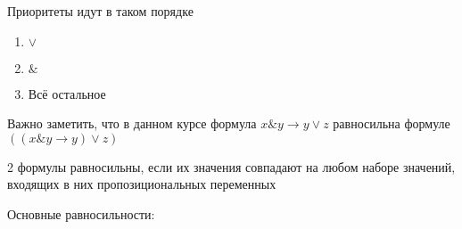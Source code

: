 \documentclass[main]{subfiles}
\begin{document}
Приоритеты идут в таком порядке
\begin{enumerate}
    \item $\lor$
    \item $\&$
    \item Всё остальное
\end{enumerate}
\begin{remark}
    Важно заметить, что в данном курсе формула $x\& y \to y\lor z$ 
    равносильна формуле $((x\& y \to y) \lor z)$
\end{remark}
\begin{definition}
    2 формулы равносильны, если их значения совпадают на любом наборе значений, 
    входящих в них пропозициональных переменных
\end{definition}
Основные равносильности:
\begin{enumerate}
    

\end{enumerate}
\end{document}

